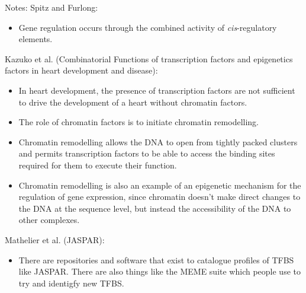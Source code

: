 Notes:
    Spitz and Furlong: 
        \begin{itemize}
            \item Gene regulation occurs through the combined activity of \emph{cis}-regulatory elements. 
        \end{itemize}
    Kazuko et al. (Combinatorial Functions of transcription factors and epigenetics factors in heart development and disease):
        \begin{itemize}
            \item In heart development, the presence of transcription factors are not sufficient to drive the development of a heart without chromatin factors. 
            \item The role of chromatin factors is to initiate chromatin remodelling.
            \item Chromatin remodelling allows the DNA to open from tightly packed clusters and permits transcription factors to be able to access the binding sites required for them to execute their function. 
            \item Chromatin remodelling is also an example of an epigenetic mechanism for the regulation of gene expression, since chromatin doesn't make direct changes to the DNA at the sequence level, but instead the accessibility of the DNA to other complexes.
        \end{itemize}
    Mathelier et al. (JASPAR):
        \begin{itemize}
            \item There are repositories and software that exist to catalogue profiles of TFBS like JASPAR. There are also things like the MEME suite which people use to try and identigfy new TFBS.
        \end{itemize}
    
    